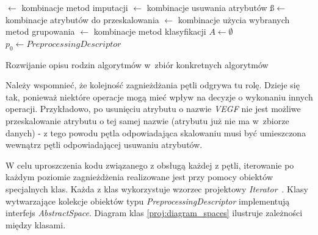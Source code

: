 \documentclass[../thesis.tex]{subfiles}
\begin{document}
\begin{algorithm}[ht]
  
  \is$\leftarrow$ kombinacje metod imputacji\;
  \rs$\leftarrow$ kombinacje usuwania atrybutów\;
  \ss$\leftarrow$ kombinacje atrybutów do przeskalowania\;
  \gs$\leftarrow$ kombinacje użycia wybranych metod grupowania\;
  \cs$\leftarrow$ kombinacje metod klasyfikacji\;
  \BlankLine
  $A \leftarrow \emptyset$\;
  $p_0 \leftarrow PreprocessingDescriptor$\;
  \caption{Rozwijanie opisu rodzin algorytmów w~zbiór konkretnych algorytmów}
  \label{proj:algorithm_loops}
\end{algorithm}

Należy wspomnieć, że kolejność zagnieżdżania pętli odgrywa tu rolę. Dzieje się tak, ponieważ niektóre operacje mogą mieć wpływ na decyzje o wykonaniu innych operacji. Przykładowo, po usunięciu atrybutu o nazwie \emph{VEGF} nie jest możliwe przeskalowanie atrybutu o tej samej nazwie (atrybutu już nie ma w~zbiorze danych) - z tego powodu pętla odpowiadająca skalowaniu musi być umieszczona wewnątrz pętli odpowiadającej usuwaniu atrybutów. 

W celu uproszczenia kodu związanego z obsługą każdej z pętli, iterowanie po każdym poziomie zagnieżdżenia realizowane jest przy pomocy obiektów specjalnych klas. Każda z klas wykorzystuje wzorzec projektowy \emph{Iterator}~\cite{gang_of_four}. Klasy wytwarzające kolekcje obiektów typu \emph{PreprocessingDescriptor} implementują interfejs \emph{AbstractSpace}. Diagram klas \ref{proj:diagram_spaces} ilustruje zależności między klasami.
\end{document}

